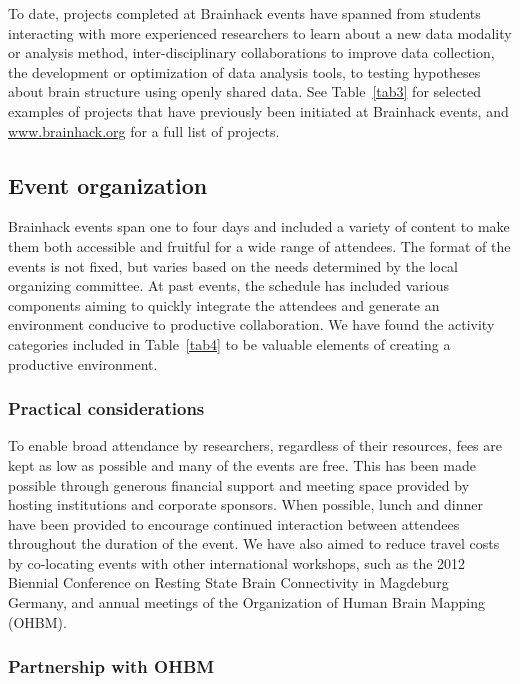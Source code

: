 \documentclass[11pt]{bmc_article_s50}
\begin{document}
To date, projects completed at Brainhack events have spanned from students interacting with more experienced researchers to learn about a new data modality or analysis method, inter-disciplinary collaborations to improve data collection, the development or optimization of data analysis tools, to testing hypotheses about brain structure using openly shared data. See Table~\ref{tab3} for selected examples of projects that have previously been initiated at Brainhack events, and \href{http://www.brainhack.org}{www.brainhack.org} for a full list of projects.

\subsection{Event organization}

Brainhack events span one to four days and included a variety of content to make them both accessible and fruitful for a wide range of attendees. The format of the events is not fixed, but varies based on the needs determined by the local organizing committee. At past events, the schedule has included various components aiming to quickly integrate the attendees and generate an environment conducive to productive collaboration. We have found the activity categories included in Table~\ref{tab4} to be valuable elements of creating a productive environment. 

\subsubsection{Practical considerations}

To enable broad attendance by researchers, regardless of their resources, fees are kept as low as possible and many of the events are free. This has been made possible through generous financial support and meeting space provided by hosting institutions and corporate sponsors. When possible, lunch and dinner have been provided to encourage continued interaction between attendees throughout the duration of the event. We have also aimed to reduce travel costs by co-locating events with other international workshops, such as the 2012 Biennial Conference on Resting State Brain Connectivity in Magdeburg Germany, and annual meetings of the Organization of Human Brain Mapping (OHBM). 

\subsubsection{Partnership with OHBM}
\end{document}
